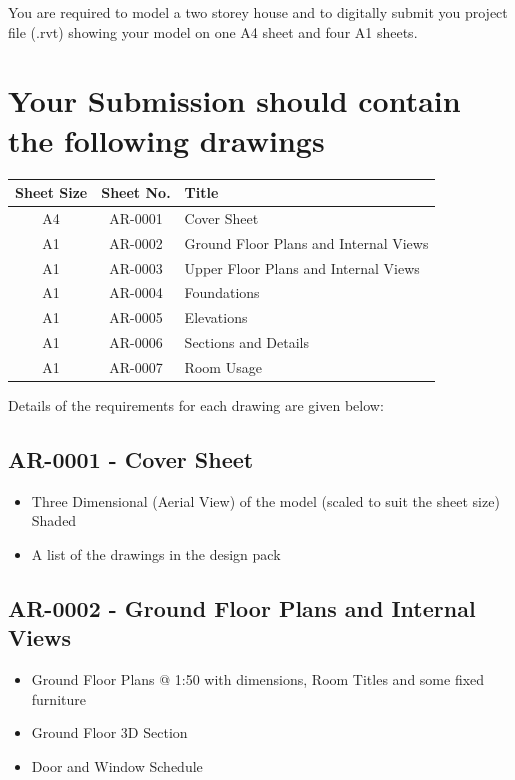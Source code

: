 \vspace{1cm}




You are required to model a two storey house and to digitally submit you project file (.rvt) showing your model on one A4 sheet and four A1 sheets.


\newpage
\section*{Your Submission should contain the following drawings}



\begin{tabularx}{\textwidth}{ |c|c|X| }
	\hline
	\textbf{Sheet Size} & \textbf{Sheet No.} & \textbf{Title} \\
	\hline 
	A4  & AR-0001 & Cover Sheet \\
	A1  & AR-0002 & Ground Floor Plans and Internal Views \\
	A1  & AR-0003 & Upper Floor Plans and Internal Views \\
	A1  & AR-0004 & Foundations \\
	A1  & AR-0005 & Elevations \\
	A1  & AR-0006 & Sections and Details \\
	A1  & AR-0007 & Room Usage \\
	\hline
\end{tabularx}

Details of the requirements for each drawing are given below:\\

\subsection*{AR-0001 - Cover Sheet}
\begin{itemize}
	\item Three Dimensional (Aerial View) of the model (scaled to suit the sheet size) Shaded
	\item A list of the drawings in the design pack
\end{itemize}


\subsection*{AR-0002 - Ground Floor Plans and Internal Views}
\begin{itemize}
	\item Ground Floor Plans @ 1:50 with dimensions, Room Titles and some fixed furniture
	\item Ground Floor 3D Section
	\item Door and Window Schedule
\end{itemize}



